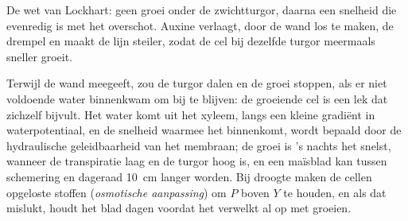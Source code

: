 \begin{omfigure}

{\small De wet van Lockhart: geen groei onder de zwichtturgor, daarna een
snelheid die evenredig is met het overschot. Auxine verlaagt, door de wand
los te maken, de drempel en maakt de lijn steiler, zodat de cel bij dezelfde
turgor meermaals sneller groeit.}
\end{omfigure}

\begin{example}\label{ex:b2:plant-meristems:water}
Terwijl de wand meegeeft, zou de turgor dalen en de groei stoppen, als er
niet voldoende water binnenkwam om bij te blijven: de groeiende cel is een
lek dat zichzelf bijvult. Het water komt uit het xyleem, langs een kleine
gradiënt in waterpotentiaal, en de snelheid waarmee het binnenkomt, wordt
bepaald door de hydraulische geleidbaarheid van het membraan; de groei is
's nachts het snelst, wanneer de transpiratie laag en de turgor hoog is,
en een maïsblad kan tussen schemering en dageraad \qty{10}{cm} langer
worden. Bij droogte maken de cellen opgeloste stoffen (\emph{osmotische
aanpassing}) om $P$ boven $Y$ te houden, en als dat mislukt, houdt het blad
dagen voordat het verwelkt al op met groeien.
\end{example}

